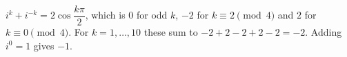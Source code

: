 $i^k+i^{-k}=2\cos\dfrac{k\pi}2$, which is $0$ for odd $k$, $-2$ for $k\equiv2\pmod4$ and $2$ for $k\equiv0\pmod4$. For $k=1,\dots,10$ these sum to $-2+2-2+2-2=-2$. Adding $i^0=1$ gives $\boxed{-1}$.
